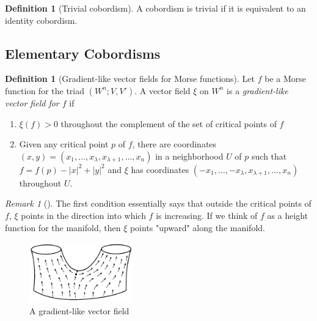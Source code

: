 \documentclass[reqno]{amsart}
\theoremstyle{definition}
\newtheorem{definition}[theorem]{Definition}
\theoremstyle{remark}
\newtheorem*{remark}{Remark}
\begin{document}
        \begin{definition}[Trivial cobordism]
            A cobordism is trivial if it is equivalent to
            an identity cobordism.
        \end{definition}


        \subsection{Elementary Cobordisms}

        \begin{definition}[Gradient-like vector fields for
            Morse functions]
            Let $f$ be a Morse function for the
            triad 
            $\left( W^{n}; V, V' \right) $. A vector field
            $\xi$ on $W^{n}$ is a \textit{gradient-like
            vector field for $f$} if
            \begin{enumerate}
                \item $\xi (f) >0$ throughout the complement
                    of the set of critical points of $f$
                \item Given any critical point $p$ of $f$,
                    there are coordinates
                    $\left( x,y \right) =
                    \left( x_1, \ldots, x_{\lambda},
                    x_{\lambda +1}, \ldots,
                x_n\right) $ in a neighborhood $U$ of $p$ 
                such that
                $f = f(p) - \left| x \right|^2 +
                \left| y \right|^2$ and
                $\xi$ has coordinates
                $\left( -x_1, \ldots, -x_{\lambda},
                x_{\lambda +1}, \ldots,
            x_n\right) $ throughout $U$.
            \end{enumerate}
        \end{definition}

        \begin{remark}[]
            The first condition essentially says
            that outside the critical points of
            $f$, $\xi$ points in the direction into
            which $f$ is increasing. If
            we think of $f$ as a height function for
            the manifold, then $\xi$ points "upward" along
            the manifold. 
        \end{remark}

        \begin{figure}[htpb]
            \centering
            \includegraphics[width=0.4\textwidth]{gradient-like-vector-field.png}
            \caption{A gradient-like vector field}
            \label{fig:gradient-like-vector-field-png}
        \end{figure}
\end{document}

